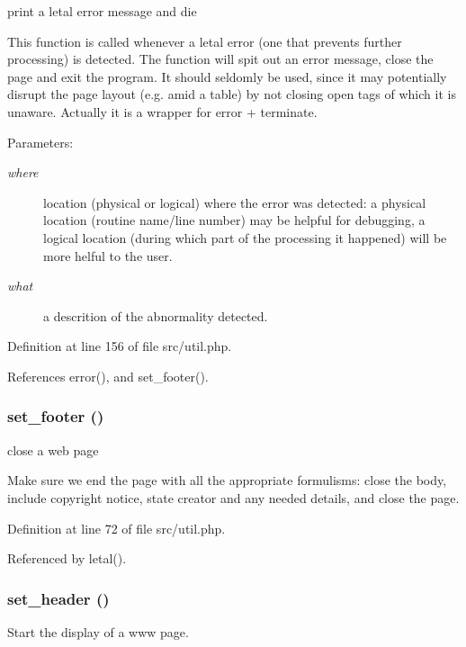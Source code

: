 print a letal error message and die 

This function is called whenever a letal error (one that prevents further processing) is detected. The function will spit out an error message, close the page and exit the program. It should seldomly be used, since it may potentially disrupt the page layout (e.g. amid a table) by not closing open tags of which it is unaware. Actually it is a wrapper for error + terminate.

\begin{Desc}
\item[Parameters:]
\begin{description}
\item[{\em where}]location (physical or logical) where the error was detected: a physical location (routine name/line number) may be helpful for debugging, a logical location (during which part of the processing it happened) will be more helful to the user.\item[{\em what}]a descrition of the abnormality detected. \end{description}
\end{Desc}


Definition at line 156 of file src/util.php.

References error(), and set\_\-footer().
\subsubsection{\setlength{\rightskip}{0pt plus 5cm}set\_\-footer ()}\label{src_2util_8php_a1}


close a web page 

Make sure we end the page with all the appropriate formulisms: close the body, include copyright notice, state creator and any needed details, and close the page. 

Definition at line 72 of file src/util.php.

Referenced by letal().
\subsubsection{\setlength{\rightskip}{0pt plus 5cm}set\_\-header ()}\label{src_2util_8php_a0}


Start the display of a www page. 

